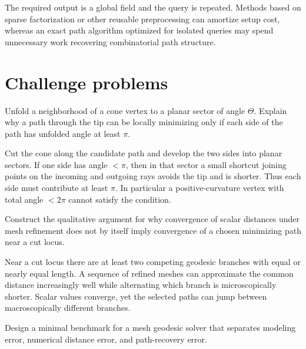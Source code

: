 \begin{solution}
The required output is a global field and the query is repeated.  Methods based on sparse factorization or other reusable preprocessing can amortize setup cost, whereas an exact path algorithm optimized for isolated queries may spend unnecessary work recovering combinatorial path structure.
\end{solution}

\section{Challenge problems}

\begin{problem}\label{prob:vii38-ch01}
Unfold a neighborhood of a cone vertex to a planar sector of angle \(\Theta\).  Explain why a path through the tip can be locally minimizing only if each side of the path has unfolded angle at least \(\pi\).
\end{problem}

\begin{solution}
Cut the cone along the candidate path and develop the two sides into planar sectors.  If one side has angle \(<\pi\), then in that sector a small shortcut joining points on the incoming and outgoing rays avoids the tip and is shorter.  Thus each side must contribute at least \(\pi\).  In particular a positive-curvature vertex with total angle \(<2\pi\) cannot satisfy the condition.
\end{solution}

\begin{problem}\label{prob:vii38-ch02}
Construct the qualitative argument for why convergence of scalar distances under mesh refinement does not by itself imply convergence of a chosen minimizing path near a cut locus.
\end{problem}

\begin{solution}
Near a cut locus there are at least two competing geodesic branches with equal or nearly equal length.  A sequence of refined meshes can approximate the common distance increasingly well while alternating which branch is microscopically shorter.  Scalar values converge, yet the selected paths can jump between macroscopically different branches.
\end{solution}

\begin{problem}\label{prob:vii38-ch03}
Design a minimal benchmark for a mesh geodesic solver that separates modeling error, numerical distance error, and path-recovery error.
\end{problem}

